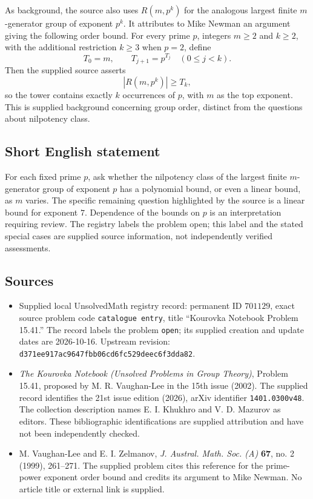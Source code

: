 \documentclass[11pt]{article}
\begin{document}
As background, the source also uses \(R(m,p^k)\) for the analogous largest finite \(m\)-generator group of exponent \(p^k\). It attributes to Mike Newman an argument giving the following order bound. For every prime \(p\), integers \(m\geq 2\) and \(k\geq 2\), with the additional restriction \(k\geq 3\) when \(p=2\), define
\[
T_0=m,\qquad T_{j+1}=p^{T_j}\quad(0\leq j<k).
\]
Then the supplied source asserts
\[
|R(m,p^k)|\geq T_k,
\]
so the tower contains exactly \(k\) occurrences of \(p\), with \(m\) as the top exponent. This is supplied background concerning group order, distinct from the questions about nilpotency class.
\subsection{Short English statement}
For each fixed prime \(p\), ask whether the nilpotency class of the largest finite \(m\)-generator group of exponent \(p\) has a polynomial bound, or even a linear bound, as \(m\) varies. The specific remaining question highlighted by the source is a linear bound for exponent \(7\). Dependence of the bounds on \(p\) is an interpretation requiring review. The registry labels the problem open; this label and the stated special cases are supplied source information, not independently verified assessments.
\subsection{Sources}
\begin{itemize}
\item Supplied local UnsolvedMath registry record: permanent ID \(701129\), exact source problem code \texttt{catalogue entry}, title ``Kourovka Notebook Problem 15.41.'' The record labels the problem \texttt{open}; its supplied creation and update dates are 2026-10-16. Upstream revision: \texttt{d371ee917ac9647fbb06cd6fc529deec6f3dda82}.
\item \emph{The Kourovka Notebook (Unsolved Problems in Group Theory)}, Problem 15.41, proposed by M. R. Vaughan-Lee in the 15th issue (2002). The supplied record identifies the 21st issue edition (2026), arXiv identifier \texttt{1401.0300v48}. The collection description names E. I. Khukhro and V. D. Mazurov as editors. These bibliographic identifications are supplied attribution and have not been independently checked.
\item M. Vaughan-Lee and E. I. Zelmanov, \emph{J. Austral. Math. Soc. (A)} \textbf{67}, no. 2 (1999), 261--271. The supplied problem cites this reference for the prime-power exponent order bound and credits its argument to Mike Newman. No article title or external link is supplied.
\end{itemize}
\end{document}
